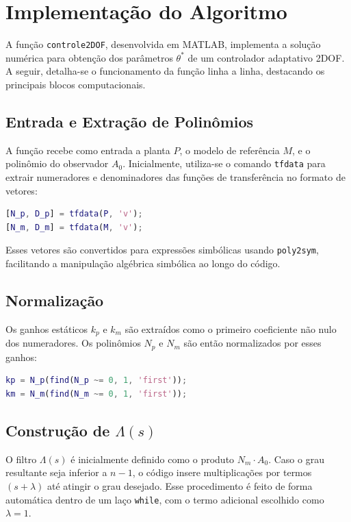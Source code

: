 \documentclass[10pt]{article}
\begin{document}
\section{Implementação do Algoritmo}

A função \texttt{controle2DOF}, desenvolvida em MATLAB, implementa a solução numérica para obtenção dos parâmetros \( \theta^* \) de um controlador adaptativo 2DOF. A seguir, detalha-se o funcionamento da função linha a linha, destacando os principais blocos computacionais.

\subsection{Entrada e Extração de Polinômios}

A função recebe como entrada a planta \( P \), o modelo de referência \( M \), e o polinômio do observador \( A_0 \). Inicialmente, utiliza-se o comando \texttt{tfdata} para extrair numeradores e denominadores das funções de transferência no formato de vetores:

\begin{lstlisting}[language=Matlab]
[N_p, D_p] = tfdata(P, 'v');
[N_m, D_m] = tfdata(M, 'v');
\end{lstlisting}

Esses vetores são convertidos para expressões simbólicas usando \texttt{poly2sym}, facilitando a manipulação algébrica simbólica ao longo do código.

\subsection{Normalização}

Os ganhos estáticos \( k_p \) e \( k_m \) são extraídos como o primeiro coeficiente não nulo dos numeradores. Os polinômios \( N_p \) e \( N_m \) são então normalizados por esses ganhos:

\begin{lstlisting}[language=Matlab]
kp = N_p(find(N_p ~= 0, 1, 'first'));
km = N_m(find(N_m ~= 0, 1, 'first'));
\end{lstlisting}

\subsection{Construção de \(\Lambda(s)\)}

O filtro \(\Lambda(s)\) é inicialmente definido como o produto \( N_m \cdot A_0 \). Caso o grau resultante seja inferior a \( n - 1 \), o código insere multiplicações por termos \( (s + \lambda) \) até atingir o grau desejado. Esse procedimento é feito de forma automática dentro de um laço \texttt{while}, com o termo adicional escolhido como \( \lambda = 1 \).
\end{document}

